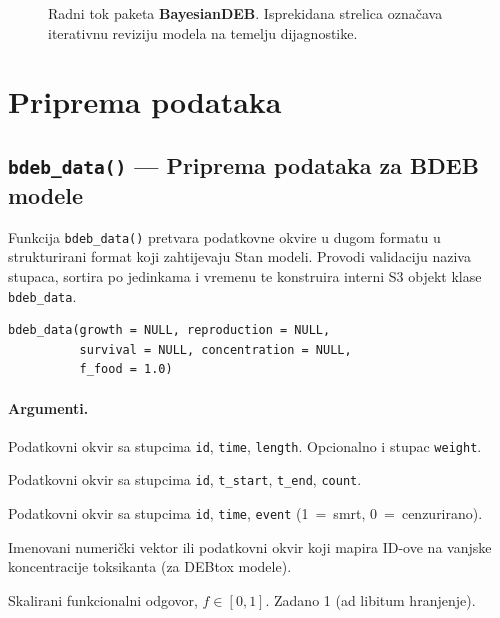 \documentclass[11pt,a4paper]{article}
\newcommand{\pkg}[1]{\textbf{#1}}
\newcommand{\fn}[1]{\texttt{#1()}}
\newcommand{\code}[1]{\texttt{#1}}
\begin{document}
\begin{figure}[H]
\caption{Radni tok paketa \pkg{BayesianDEB}.  Isprekidana strelica
  označava iterativnu reviziju modela na temelju dijagnostike.}
\label{fig:radni-tok}
\end{figure}


\section{Priprema podataka}
\label{sec:priprema}

\subsection{\fn{bdeb\_data} --- Priprema podataka za BDEB modele}

Funkcija \fn{bdeb\_data} pretvara podatkovne okvire u dugom formatu u
strukturirani format koji zahtijevaju Stan modeli.  Provodi validaciju
naziva stupaca, sortira po jedinkama i vremenu te konstruira interni S3
objekt klase \code{bdeb\_data}.

\begin{lstlisting}
bdeb_data(growth = NULL, reproduction = NULL,
          survival = NULL, concentration = NULL,
          f_food = 1.0)
\end{lstlisting}

\paragraph{Argumenti.}
\begin{description}[nosep,leftmargin=3.5cm,style=nextline]
  \item[\code{growth}] Podatkovni okvir sa stupcima \code{id}, \code{time},
    \code{length}.  Opcionalno i stupac \code{weight}.
  \item[\code{reproduction}] Podatkovni okvir sa stupcima \code{id},
    \code{t\_start}, \code{t\_end}, \code{count}.
  \item[\code{survival}] Podatkovni okvir sa stupcima \code{id},
    \code{time}, \code{event} (1~=~smrt, 0~=~cenzurirano).
  \item[\code{concentration}] Imenovani numerički vektor ili podatkovni
    okvir koji mapira ID-ove na vanjske koncentracije toksikanta (za
    DEBtox modele).
  \item[\code{f\_food}] Skalirani funkcionalni odgovor, $f \in [0,1]$.
    Zadano 1 (ad libitum hranjenje).
\end{description}
\end{document}
